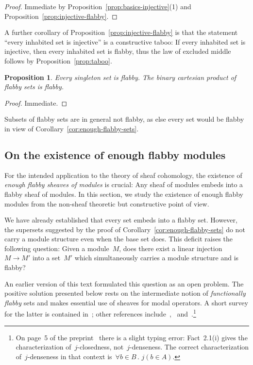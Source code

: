 \documentclass[oneside]{amsart}
\theoremstyle{definition}
\theoremstyle{plain}
\newtheorem{prop}[defn]{Proposition}
\theoremstyle{remark}
\renewcommand{\_}{\mathpunct{.}\,}
\begin{document}
\begin{proof}Immediate by Proposition~\ref{prop:basics-injective}(1) and
Proposition~\ref{prop:injective-flabby}.\end{proof}

A further corollary of Proposition~\ref{prop:injective-flabby} is that the
statement ``every inhabited set is injective'' is a constructive taboo: If every
inhabited set is injective, then every inhabited set is flabby, thus the law of
excluded middle follows by Proposition~\ref{prop:taboo}.

\begin{prop}Every singleton set is flabby. The binary cartesian product of flabby sets
is flabby.\end{prop}

\begin{proof}Immediate.\end{proof}

Subsets of flabby sets are in general not flabby, as else every set would be
flabby in view of Corollary~\ref{cor:enough-flabby-sets}.


\subsection{On the existence of enough flabby modules}
\label{sect:enough-flabby-modules}

For the intended application to the theory of sheaf cohomology, the existence
of \emph{enough flabby sheaves of modules} is crucial: Any sheaf of modules
embeds into a flabby sheaf of modules. In this section, we study the existence
of enough flabby modules from the non-sheaf theoretic but constructive point of
view.

We have already established that every set embeds into a flabby set. However,
the supersets suggested by the proof of Corollary~\ref{cor:enough-flabby-sets}
do not carry a module structure even when the base set does. This deficit
raises the following question: Given a module~$M$, does there exist a linear
injection~$M \to M'$ into a set~$M'$ which simultaneously carries a module
structure and is flabby?

An earlier version of this text formulated this question as an open problem.
The positive solution presented below rests on the intermediate notion of
\emph{functionally flabby} sets and makes essential use of sheaves for modal
operators. A short survey for the latter is contained
in~\cite[Section~6]{blechschmidt:phd}; other references
include~\cite[Sections~14.4f.]{goldblatt:topoi},~\cite{goldblatt:modality}
\cite{vries:sheafification} and~\cite{fourman-scott:sheaves-and-logic}.\footnote{On page~5 of the
preprint~\cite{vries:sheafification} there is a slight typing error:
Fact~2.1(i) gives the characterization of~$j$-closedness, not~$j$-denseness.
The correct characterization of~$j$-denseness in that context is~$\forall b \in
B\_ j(b \in A)$.}
\end{document}
